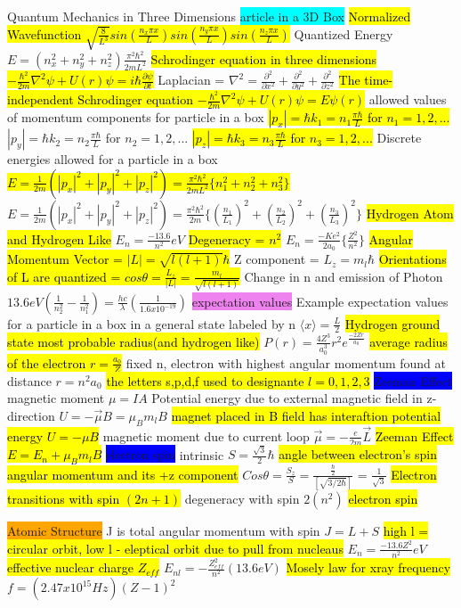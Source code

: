 \documentclass[6pt, oneside]{article}   	%
\begin{document}
\colorbox{BurntOrange}{Quantum Mechanics in Three Dimensions}
\colorbox{Cyan}{article in a 3D Box}
\hl{Normalized Wavefunction $\sqrt{\frac{8}{L^3}}sin(\frac{n_x\pi x}{L})sin(\frac{n_y\pi x}{L})sin(\frac{n_z\pi x}{L})$}
Quantized Energy $E = (n_x^2 +n_y^2 +n_z^2)\frac{\pi^2 \hbar^2}{2mL^2}$
\hl{Schrodinger equation in three dimensions $-\frac{\hbar^2}{2m}\nabla^2\psi + U(r)\psi = i\hbar \frac{\partial\psi}{\partial t}$}
Laplacian = $\nabla^2 = \frac{\partial^2}{\partial x^2}+\frac{\partial^2}{\partial y^2}+\frac{\partial^2}{\partial z^2}$
\hl{The time-independent Schrodinger equation $-\frac{\hbar^2}{2m}\nabla^2\psi + U(r)\psi = E\psi (r)$}  
allowed values of momentum components for particle in a box 
\hl{$|p_x| = \hbar k_1 = n_1\frac{\pi \hbar}{L}$ for $ n_1 = 1,2,... $}
$|p_y| = \hbar k_2 = n_2\frac{\pi \hbar}{L}$ for $ n_2 = 1,2,... $
\hl{$|p_z| = \hbar k_3 = n_3\frac{\pi \hbar}{L}$ for $ n_3 = 1,2,... $}
Discrete energies allowed for a particle in a box
\hl{$E=\frac{1}{2m}(|p_x|^2+|p_y|^2+|p_z|^2)=\frac{\pi^2\hbar^2}{2mL^2} \{n_1^2+n_2^2+n_3^2\}$}
$E=\frac{1}{2m}(|p_x|^2+|p_y|^2+|p_z|^2)=\frac{\pi^2\hbar^2}{2m} \{(\frac{n_1}{L_1})^2+(\frac{n_2}{L_2})^2+(\frac{n_3}{L_3})^2\}$
\hl{Hydrogen Atom and Hydrogen Like}
$E_n = \frac{-13.6}{n^2}eV$
\hl{Degeneracy = $n^2$}
$E_n=\frac{-Ke^2}{2a_0}\{\frac{Z^2}{n^2}\}$
\hl{Angular Momentum Vector = $|L|=\sqrt{l(l+1)}\hbar$}
Z component = $L_z=m_l\hbar$
\hl{Orientations of L are quantized = $cos\theta = \frac{L_z}{|L|}=\frac{m_l}{\sqrt{l(l+1)}}$}
Change in n and emission of Photon $13.6eV(\frac{1}{n_2^2}-\frac{1}{n_1^2})=\frac{hc}{\lambda}(\frac{1}{1.6x10^{-19}})$
\colorbox{Violet}{expectation values} Example expectation values for a particle in a box in a general state labeled by n
$\langle x \rangle= \frac{L}{2}$
\hl{Hydrogen ground state most probable radius(and hydrogen like)}
$P(r)=\frac{4Z^3}{a_0^3}r^2e^{\frac{-2Zr}{a_0}}$
\hl{average radius of the electron $r = \frac{a_0}{Z}$}
fixed n, electron with highest angular momentum found at distance $r = n^2 a_0$
\hl{the letters s,p,d,f used to designante $l = 0,1,2,3$}
\colorbox{Blue}{Zeeman Effect}
magnetic moment $\mu = IA$ Potential energy due to external magnetic field in z-direction $U=-\vec{\mu}B = \mu_B m_l B$
\hl{magnet placed in B field has interaftion potential energy $ U = -\mu B$}
magnetic moment due to current loop $\vec{\mu} =-\frac{e}{2m}\vec{L}$
\hl{Zeeman Effect $E = E_n + \mu_B m_l B$}
\colorbox{Blue}{electron spin}
intrinsic $S = \frac{\sqrt{3}}{2}\hbar$
\hl{angle between electron's spin angular momentum and its +z component}
$Cos \theta = \frac{S_z}{S}=\frac{\frac{\hbar}{2}}{[\sqrt{3/2\hbar}]}$ = $\frac{1}{\sqrt{3}}$
\hl{Electron transitions with spin $(2n+1)$}
degeneracy with spin $2(n^2)$
\hl{electron spin}

\colorbox{Orange}{Atomic Structure}
J is total angular momentum with spin $J = L + S$
\hl{high l = circular orbit, low l - eleptical orbit due to pull from nucleaus}
$E_n = \frac{-13.6Z^2}{n^2}eV$
\hl{effective nuclear charge $Z_{eff}$}
$E_{nl}=-\frac{Z_{eff}^{2}}{n^2}(13.6eV)$
\hl{Mosely law for xray frequency}
$f=(2.47x10^{15}Hz)(Z-1)^2$

\end{document}
